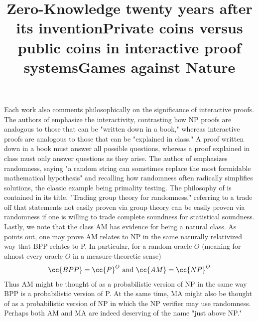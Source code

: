 Each work also comments philosophically on the significance of interactive proofs.
The authors of \cite{GMR85} emphasize the interactivity, contrasting how NP proofs are analogous to those that can be "written down in a book," whereas interactive proofs are analogous to those that can be "explained in class."
A proof written down in a book must answer all possible questions, whereas a proof explained in class must only answer questions as they arise.
The author of \cite{Bab85} emphasizes randomness, saying "a random string can sometimes replace the most formidable mathematical hypothesis" and recalling how randomness often radically simplifies solutions, the classic example being primality testing.
The philosophy of \cite{Bab85} is contained in its title, "Trading group theory for randomness," referring to a trade off that statements not easily proven via group theory can be easily proven via randomness if one is willing to trade complete soundness for statistical soundness.
Lastly, we note that the class AM has evidence for being a natural class.
As \cite{Bab85} points out, one may prove AM relates to NP in the same naturally relativized way that BPP relates to P.
In particular, for a random oracle $O$ (meaning for almost every oracle $O$ in a measure-theoretic sense)
\begin{align}
    \cc{BPP} = \cc{P}^O \text{ and } \cc{AM} = \cc{NP}^O
\end{align}
Thus AM might be thought of as a probabilistic version of NP in the same way BPP is a probabilistic version of P.
At the same time, MA might also be thought of as a probabilistic version of NP in which the NP verifier may use randomness.
Perhaps both AM and MA are indeed deserving of the name "just above NP."

\begin{references}
    \title{Zero-Knowledge twenty years after its invention}

    \title{Private coins versus public coins in interactive proof systems}

    \title{Games against Nature}
\end{references}